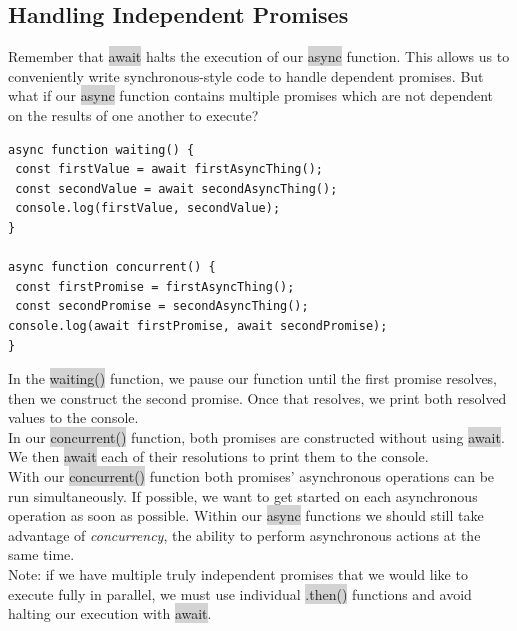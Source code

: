 \documentclass[11pt]{article}
\begin{document}
\subsection{Handling Independent Promises}
Remember that \colorbox{lightgray}{await} halts the execution of our \colorbox{lightgray}{async} function. This allows us to conveniently write synchronous-style code to handle dependent promises. But what if our \colorbox{lightgray}{async} function contains multiple promises which are not dependent on the results of one another to execute?
\begin{lstlisting}
async function waiting() {
 const firstValue = await firstAsyncThing();
 const secondValue = await secondAsyncThing();
 console.log(firstValue, secondValue);
}

async function concurrent() {
 const firstPromise = firstAsyncThing();
 const secondPromise = secondAsyncThing();
console.log(await firstPromise, await secondPromise);
}
\end{lstlisting}
In the \colorbox{lightgray}{waiting()} function, we pause our function until the first promise resolves, then we construct the second promise. Once that resolves, we print both resolved values to the console. \\
\newline
In our \colorbox{lightgray}{concurrent()} function, both promises are constructed without using \colorbox{lightgray}{await}. We then \colorbox{lightgray}{await} each of their resolutions to print them to the console. \\
\newline
With our \colorbox{lightgray}{concurrent()} function both promises’ asynchronous operations can be run simultaneously. If possible, we want to get started on each asynchronous operation as soon as possible. Within our \colorbox{lightgray}{async} functions we should still take advantage of \textit{concurrency}, the ability to perform asynchronous actions at the same time. \\
\newline
Note: if we have multiple truly independent promises that we would like to execute fully in parallel, we must use individual \colorbox{lightgray}{.then()} functions and avoid halting our execution with \colorbox{lightgray}{await}.
\end{document}
